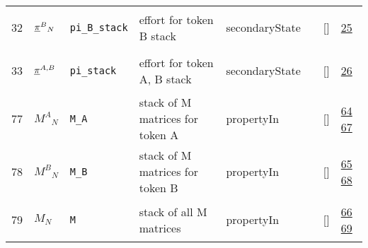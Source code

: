 \begin{longtable}{|p{1cm}|p{3cm}|p{3cm}|p{7cm}|p{3.0cm}|p{3cm}|p{2cm}|p{1cm}|}
    32
             & \hypertarget{"v:32"}{ $ {{{{\protect\underline{\bf{\pi}}}}^B}}{_{N}} $}
             & \verb|pi_B_stack|
             & effort for token B stack
             & \begin{lay}secondaryState \end{lay}
             & $  $
             & []
             & \hyperlink{"e:25"}{ 25 }
                 \\
    33
             & \hypertarget{"v:33"}{ $ {{{{\protect\underline{\bf{\pi}}}}^{A,B}}}{_{}} $}
             & \verb|pi_stack|
             & effort for token A, B stack
             & \begin{lay}secondaryState \end{lay}
             & $  $
             & []
             & \hyperlink{"e:26"}{ 26 }
                 \\
    77
             & \hypertarget{"v:77"}{ $ {{M^A}}{_{N}} $}
             & \verb|M_A|
             & stack of M matrices for token A
             & \begin{lay}propertyIn \end{lay}
             & $  $
             & []
             & \hyperlink{"e:64"}{ 64 }
                 \hyperlink{"e:67"}{ 67 }
                 \\
    78
             & \hypertarget{"v:78"}{ $ {{M^B}}{_{N}} $}
             & \verb|M_B|
             & stack of M matrices for token B
             & \begin{lay}propertyIn \end{lay}
             & $  $
             & []
             & \hyperlink{"e:65"}{ 65 }
                 \hyperlink{"e:68"}{ 68 }
                 \\
    79
             & \hypertarget{"v:79"}{ $ {M}{_{N}} $}
             & \verb|M|
             & stack of all M matrices
             & \begin{lay}propertyIn \end{lay}
             & $  $
             & []
             & \hyperlink{"e:66"}{ 66 }
                 \hyperlink{"e:69"}{ 69 }
                 \\
    \end{longtable}